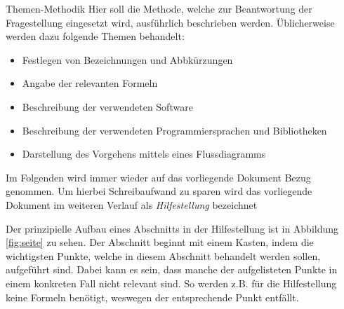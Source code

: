 %
\begin{simplebox}{Themen-Methodik}
%
Hier soll die Methode, welche zur Beantwortung der Fragestellung eingesetzt wird, ausführlich beschrieben werden.
Üblicherweise werden dazu folgende Themen behandelt:
%
\begin{itemize}
\item Festlegen von Bezeichnungen und Abbkürzungen 
\item Angabe der relevanten Formeln 
\item Beschreibung der verwendeten Software 
\item Beschreibung der verwendeten Programmiersprachen und Bibliotheken
\item Darstellung des Vorgehens mittels eines Flussdiagramms 
\end{itemize}
%
\end{simplebox}
%
Im Folgenden wird immer wieder auf das vorliegende Dokument Bezug genommen. 
Um hierbei Schreibaufwand zu sparen wird das vorliegende Dokument im weiteren Verlauf als \textit{Hilfestellung} bezeichnet
\par
Der prinzipielle Aufbau eines Abschnitts in der Hilfestellung ist in Abbildung \ref{fig:seite} zu sehen.
Der Abschnitt beginnt mit einem Kasten, indem die wichtigsten Punkte, welche in diesem Abschnitt behandelt werden sollen, aufgeführt sind.
Dabei kann es sein, dass manche der aufgelisteten Punkte in einem konkreten Fall nicht relevant sind.
So werden z.B. für die Hilfestellung keine Formeln benötigt, weswegen der entsprechende Punkt entfällt. 
%
